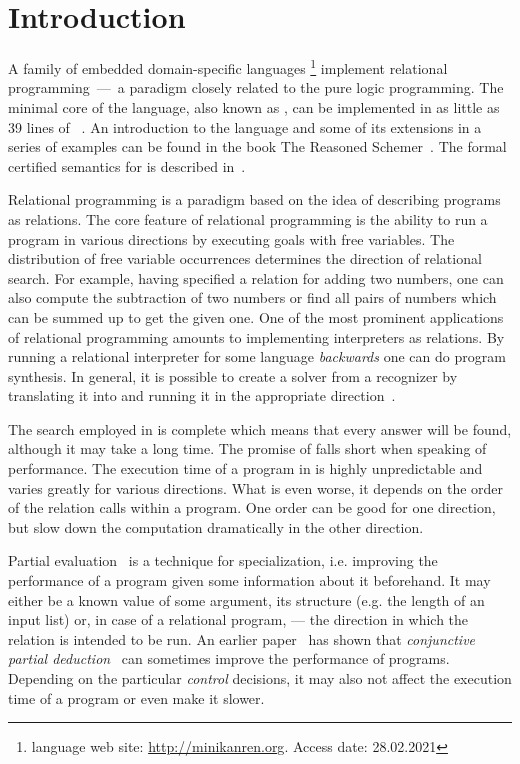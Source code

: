 \section{Introduction}
\label{intro}

A family of embedded domain-specific languages \mk\footnote{\mk language web site: \url{http://minikanren.org}. Access date: 28.02.2021} implement relational programming~---~a paradigm closely related to the pure logic programming.
The minimal core of the language, also known as \muk, can be implemented in as little as 39 lines of \scheme~\cite{friedmanmukanren}.
An introduction to the language and some of its extensions in a series of examples can be found in the book The Reasoned Schemer~\cite{TheReasonedSchemer}.
The formal certified semantics for \mk is described in~\cite{rozplokhas2020certified}.

Relational programming is a paradigm based on the idea of describing programs as relations.
The core feature of relational programming is the ability to run a program in various directions by executing goals with free variables.
The distribution of free variable occurrences determines the direction of relational search.
For example, having specified a relation for adding two numbers, one can also compute the subtraction of two numbers or find all pairs of numbers which can be summed up to get the given one.
One of the most prominent applications of relational programming amounts to implementing interpreters as relations.
By running a relational interpreter for some language \emph{backwards} one can do program synthesis.
In general, it is possible to create a solver from a recognizer by translating it into \mk and running it in the appropriate direction~\cite{lozov2019relational}.

The search employed in \mk is complete which means that every answer will be found, although it may take a long time.
The promise of \mk falls short when speaking of performance.
The execution time of a program in \mk is highly unpredictable and varies greatly for various directions.
What is even worse, it depends on the order of the relation calls within a program.
One order can be good for one direction, but slow down the computation dramatically in the other direction.

Partial evaluation~\cite{jonesbook} is a technique for specialization, i.e. improving the performance of a program given some information about it beforehand.
It may either be a known value of some argument, its structure (e.g. the length of an input list) or, in case of a relational program, --- the direction in which the relation is intended to be run.
An earlier paper~\cite{lozov2019relational} has shown that \emph{conjunctive partial deduction}~\cite{de1999conjunctive} can sometimes improve the performance of \mk programs.
Depending on the particular \emph{control} decisions, it may also not affect the execution time of a program or even make it slower.

